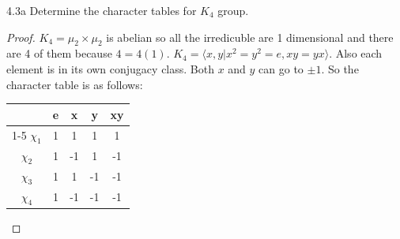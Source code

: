 \documentclass{article}
\newcommand{\angles}[1]{\langle #1 \rangle}
\begin{document}
\bigskip

\begin{PROB}{4.3a}\label{Problem 4.3a.}
    Determine the character tables for $K_4$ group. 
\end{PROB}
\begin{proof}
    $K_4 = \mu_2 \times \mu_2$ is abelian so all the irredicuble are 1 dimensional and there are 4 of them because $4 = 4(1)$. $K_4 = \angles{x, y | x^2 = y^2 = e, xy= yx}$. Also each element is in its own conjugacy class. Both $x$ and $y$ can go to $\pm 1$. So the character table is as follows:

    \begin{tabular}{c | c c c c }
       & e & x & y & xy  \\
       \cline{1-5}
       $\chi_1$ & 1 & 1 & 1 & 1 \\
       $\chi_2$ & 1 & -1 & 1 & -1 \\
       $\chi_3$ & 1 & 1 & -1 & -1 \\
       $\chi_4$ & 1 & -1 & -1 & -1 \\
   \end{tabular} 
\end{proof}

\bigskip
\end{document}
